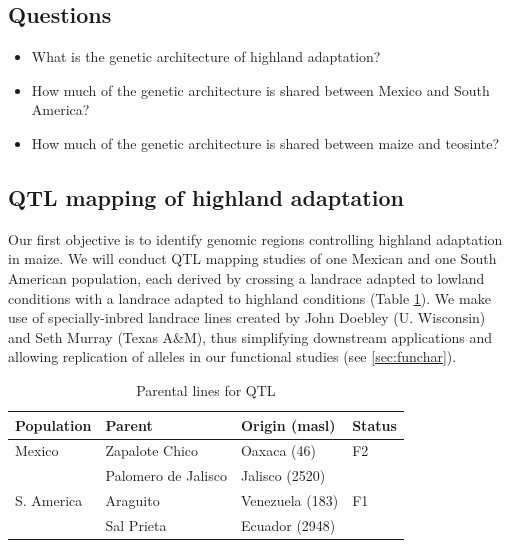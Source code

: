 \subsection*{Questions}
\begin{itemize}[topsep=0pt,itemsep=-1ex,partopsep=1ex,parsep=1ex]
\item What is the genetic architecture of highland adaptation?
\item How much of the genetic architecture is shared between Mexico and South America?
\item How much of the genetic architecture is shared between maize and teosinte?
\end{itemize}

\subsection{QTL mapping of highland adaptation} \label{subsec:qtlmap}

Our first objective is to identify  genomic regions controlling highland adaptation in maize.  We will conduct QTL mapping studies of one Mexican and one South American population, each derived by crossing a landrace adapted to lowland conditions with a  landrace adapted to highland conditions (Table \ref{tab:qtlpops}).  We make use of specially-inbred landrace lines created by John Doebley (U. Wisconsin) and Seth Murray (Texas A\&M), thus simplifying downstream applications and allowing replication of alleles in our functional studies (see \ref{sec:funchar}). 

\begin{table}
\begin{center}
\caption{Parental lines for QTL} \label{tab:qtlpops}
\begin{tabular}{llll}\\\toprule  
{\bf Population}	& {\bf Parent } &	{\bf Origin (masl)} & {\bf Status }\\ \midrule
 \rowcolor{gray!25}
Mexico	& Zapalote Chico		& Oaxaca	 (46)		&  F2 \\ 
 \rowcolor{gray!25}
	& 	Palomero de Jalisco	& 	Jalisco (2520)		& \\
S. America	& Araguito	& Venezuela (183)	&  F1 \\ 
	& Sal Prieta	 & Ecuador (2948) & \\ \bottomrule
\end{tabular}
\end{center}
\end{table} 

